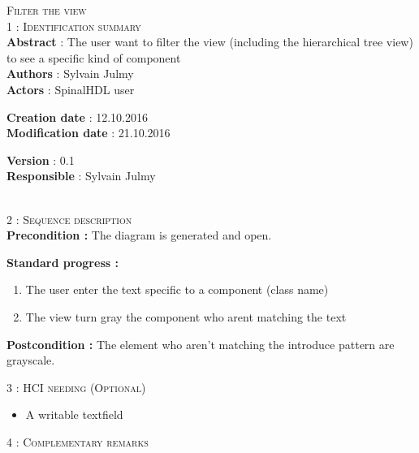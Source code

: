 \begin{flushleft}
    \textsc{\huge Filter the view}\\[0.5cm]

    \BlackLine
    \textsc{\Large 1 : Identification summary}\\[0.3cm]

        \textbf{\large Abstract} : The user want to filter the view (including the hierarchical tree view) to see a specific kind of component \\[0.1cm]

        \textbf{\large Authors} : Sylvain Julmy \\[0.3cm]			

        \textbf{\large Actors} : SpinalHDL user \\[0.1cm]	
    \begin{minipage}{0.40\textwidth}
        \begin{flushleft}	
            \textbf{\large Creation date} : 12.10.2016 \\[0.1cm]

            \textbf{\large Modification date} : 21.10.2016 \\[0.1cm]
        \end{flushleft}
    \end{minipage}
    \begin{minipage}{0.40\textwidth}
        \begin{flushleft}
            \textbf{\large Version} : 0.1 \\[0.1cm]

            \textbf{\large Responsible} : Sylvain Julmy \\[0.1cm]
        \end{flushleft}
    \end{minipage}
    \\[0.5cm]
    \BlackLine
    \textsc{\Large 2 : Sequence description}\\[0.3cm]

    \textbf{\large Precondition :} The diagram is generated and open.

    \textbf{\large  Standard progress :}
    \begin{enumerate}[nosep]
        \item The user enter the text specific to a component (class name)
        \item The view turn gray the component who arent matching the text
    \end{enumerate}

    \textbf{\large Postcondition :} The element who aren't matching the introduce pattern are grayscale.

    \BlackLine
    \textsc{\Large 3 : HCI needing (Optional)}\\[0.3cm]

    \begin{itemize}
        \item A writable textfield
    \end{itemize}

    \BlackLine
    \textsc{\Large 4 : Complementary remarks}\\[0.3cm]

\end{flushleft}
